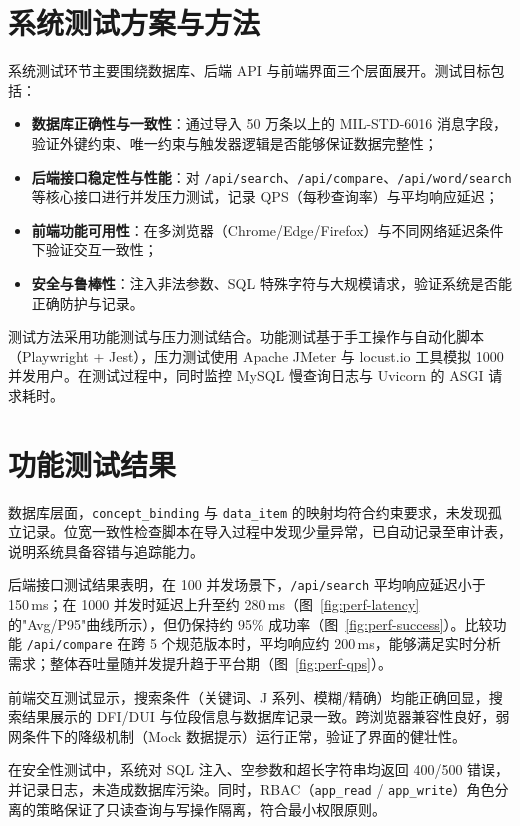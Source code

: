 \section{系统测试方案与方法}

系统测试环节主要围绕数据库、后端 API 与前端界面三个层面展开。测试目标包括：
\begin{itemize}
  \item \textbf{数据库正确性与一致性}：通过导入 50 万条以上的 MIL-STD-6016 消息字段，验证外键约束、唯一约束与触发器逻辑是否能够保证数据完整性；
  \item \textbf{后端接口稳定性与性能}：对 \texttt{/api/search}、\texttt{/api/compare}、\texttt{/api/word/search} 等核心接口进行并发压力测试，记录 QPS（每秒查询率）与平均响应延迟；
  \item \textbf{前端功能可用性}：在多浏览器（Chrome/Edge/Firefox）与不同网络延迟条件下验证交互一致性；
  \item \textbf{安全与鲁棒性}：注入非法参数、SQL 特殊字符与大规模请求，验证系统是否能正确防护与记录。
\end{itemize}

测试方法采用功能测试与压力测试结合。功能测试基于手工操作与自动化脚本（Playwright + Jest），压力测试使用 Apache JMeter 与 locust.io 工具模拟 1000 并发用户。在测试过程中，同时监控 MySQL 慢查询日志与 Uvicorn 的 ASGI 请求耗时。

\section{功能测试结果}

数据库层面，\texttt{concept\_binding} 与 \texttt{data\_item} 的映射均符合约束要求，未发现孤立记录。位宽一致性检查脚本在导入过程中发现少量异常，已自动记录至审计表，说明系统具备容错与追踪能力。

后端接口测试结果表明，在 100 并发场景下，\texttt{/api/search} 平均响应延迟小于 150\,ms；在 1000 并发时延迟上升至约 280\,ms（图~\ref{fig:perf-latency} 的"Avg/P95"曲线所示），但仍保持约 95\% 成功率（图~\ref{fig:perf-success}）。比较功能 \texttt{/api/compare} 在跨 5 个规范版本时，平均响应约 200\,ms，能够满足实时分析需求；整体吞吐量随并发提升趋于平台期（图~\ref{fig:perf-qps}）。

前端交互测试显示，搜索条件（关键词、J 系列、模糊/精确）均能正确回显，搜索结果展示的 DFI/DUI 与位段信息与数据库记录一致。跨浏览器兼容性良好，弱网条件下的降级机制（Mock 数据提示）运行正常，验证了界面的健壮性。

在安全性测试中，系统对 SQL 注入、空参数和超长字符串均返回 400/500 错误，并记录日志，未造成数据库污染。同时，RBAC（\texttt{app\_read} / \texttt{app\_write}）角色分离的策略保证了只读查询与写操作隔离，符合最小权限原则。

